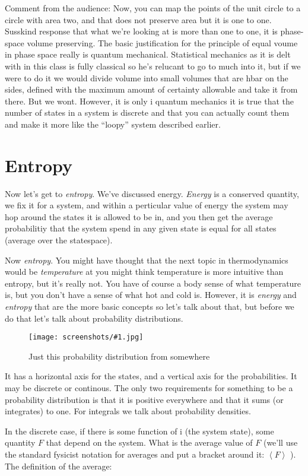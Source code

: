 \documentclass[a4, 12pt, english, USenglish]{scrreprt}
\newcommand{\screenshot}[2]{
\begin{figure}[htb]
\texttt{[image: screenshots/\#1.jpg]}
\label{#1}
\caption{#2}
\end{figure}}
\newcommand{\ev}[1]{\ensuremath{\left\langle{}#1{}\right\rangle}}
\newcommand{\idx}[1]{{\em #1}\index{#1}}
\begin{document}
Comment from the audience:  Now, you can map the points of the unit
circle to a circle with area two, and that does not preserve area but
it is one to one.  Susskind response that what we're looking at is
more than one to one, it is phase-space volume preserving.  The basic
justification for the principle of equal voume in phase space really
is quantum mechanical.  Statistical mechanics as it is delt with in
this class is fully classical so he's relucant to go to much into it,
but if we  were to do it we would divide volume into small volumes
that are hbar on the sides, defined with the maximum amount of
certainty allowable and take it from there.     But we wont.  However,
it is only i quantum mechanics it is true that the number of states in
a system is discrete and that you can actually count them and make it
more like the ``loopy'' system described earlier.


\section{Entropy}

Now let's get to \idx{entropy}.  We've discussed energy.  \idx{Energy}
is a conserved quantity, we fix it for a system, and within a
perticular value of energy the system may hop around the states it is
allowed to be in, and you then get the average probabilitiy that the
system spend in any given state is equal for all states (average over
the statespace).

Now \idx{entropy}. You might have thought that the next topic in
thermodynamics would be \idx{temperature} at you might think temperature is
more intuitive than entropy, but it's really not.  You have of course
a body sense of what temperature is, but you don't have a sense of
what hot and cold is.    However, it is \idx{energy} and \idx{entropy} that are
the more basic concepts so let's talk about that, but before we do
that let's talk about probability distributions.

\screenshot{probabilitydistribution}{Just this probability
 distribution from somewhere}

It has a horizontal axis for the states, and a vertical axis for the
probabilities.  It may be discrete or continous.   The only two
requirements for something to be a probability distribution is that it
is positive everywhere and that it sums (or integrates) to one.  For
integrals we talk about probability densities.

In the discrete case, if there is some function of i (the system
state), some quantity \(F\)
that depend on the system.  What is the average value of \(F\) (we'll use
the standard fysicist  notation for averages and put a bracket around
it: \(\ev{F}\) ).  The definition of the average:
\end{document}
